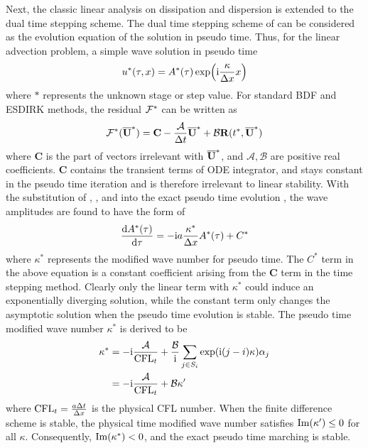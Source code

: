 Next, the classic linear analysis on dissipation and dispersion is
extended to the dual time stepping scheme. The dual time
stepping scheme of  can be
considered as the evolution equation of the solution in pseudo time.
Thus, for the linear advection problem,
a simple wave solution in pseudo time
\begin{equation}
    u^*(\tau,x) = A^*(\tau)\exp(\mathrm{i} \frac{\kappa}{{\Delta} x} x)
    \label{eq:simpleWaveTestTau}
\end{equation}
where $*$ represents the unknown stage or step value.
For standard BDF and ESDIRK methods, the residual $\mathcal{F}^*$
can be written as
\begin{equation}
    \mathcal{F}^*(\overline{\mathbf{U}}^*) = \mathbf{C} - \frac{\mathcal{A}}{{\Delta} t} \overline{\mathbf{U}}^* + \mathcal{B}\mathbf{R}(t^*, \overline{\mathbf{U}}^*)
    \label{eq:canonicalFF}
\end{equation}
where $\mathbf{C}$ is the part of vectors irrelevant with $\overline{\mathbf{U}}^*$,
and $\mathcal{A},\mathcal{B}$ are positive real coefficients.
$\mathbf{C}$ contains the transient terms of ODE integrator,
and stays constant in the pseudo time iteration and is
therefore irrelevant to linear stability.
With the substitution of ,
,
and
into the exact pseudo time evolution ,
the wave amplitudes are found to have the form of
\begin{equation}
    \frac{\dd A^*(\tau)}{\dd \tau} = -\mathrm{i} a\frac{\kappa^*}{{\Delta} x}  A^*(\tau) + C^*
    \label{eq:kappaSDefTau}
\end{equation}
where $\kappa^*$ represents the modified wave number for pseudo time.
The $C^*$ term in the above equation is a constant coefficient arising
from the $\mathbf{C}$ term in the time stepping method.
Clearly only the linear term with $\kappa^*$ could induce an exponentially diverging
solution, while the constant term only changes the asymptotic solution
when the pseudo time evolution is stable.
The pseudo time modified wave number $\kappa^*$ is derived to be
\begin{equation}
    \begin{aligned}
        \kappa^* & = -\mathrm{i}\frac{\mathcal{A}}{\text{CFL}_t} +
        \frac{\mathcal{B}}{\mathrm{i}} \sum_{j\in S_i}\exp(\mathrm{i} (j-i)\kappa)\alpha_j \\
                 & =-\mathrm{i}\frac{\mathcal{A}}{\text{CFL}_t} + \mathcal{B}\kappa'
    \end{aligned}
\end{equation}
where $\text{CFL}_t = \frac{a{\Delta} t }{{\Delta} x}$ is the physical CFL number.
When the finite difference scheme is stable,
the physical time modified wave number satisfies $\mathrm{Im} (\kappa') \leq 0$ for
all $\kappa$.
Consequently, $\mathrm{Im} (\kappa^*) < 0$, and the exact pseudo time marching
is stable.

